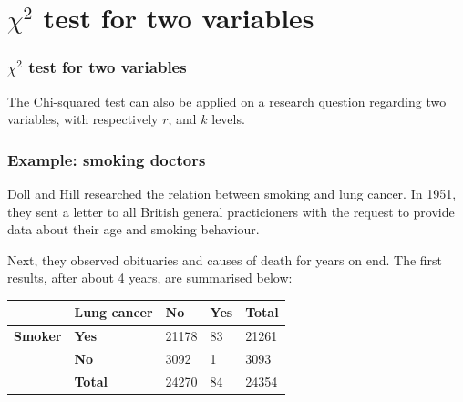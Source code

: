\documentclass{beamer}
\begin{document}
\section{$\chi^{2}$ test for two variables}
\sectionframelogo{}

\begin{frame}
  \frametitle{$\chi^{2}$ test for two variables}
  The Chi-squared test can also be applied on a research question regarding two variables, with respectively $r$, and $k$ levels.
\end{frame}

\begin{frame}
  \frametitle{Example: smoking doctors}
  
  Doll and Hill researched the relation between smoking and lung cancer. In 1951, they sent a letter to all British general practicioners with the request to provide data about their age and smoking behaviour.
  
  Next, they observed obituaries and causes of death for years on end. The first results, after about 4 years, are summarised below:

  \begin{table}[h]
    \begin{tabular}{@{}lllll@{}}
    	\toprule
    	                & \textbf{Lung cancer} & \textbf{No} & \textbf{Yes} & \textbf{Total} \\ \midrule
    	\textbf{Smoker} & \textbf{Yes}         & 21178       & 83           & 21261          \\
    	                & \textbf{No}          & 3092        & 1            & 3093           \\
    	                & \textbf{Total}       & 24270       & 84           & 24354          \\ \bottomrule
    \end{tabular}
  \end{table}
\end{frame}
\end{document}
